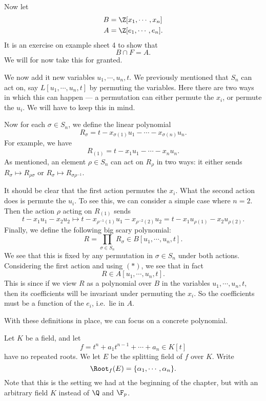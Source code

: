 \documentclass[a4paper]{article}
\begin{document}
Now let
\begin{align*}
  B &= \Z[x_1, \cdots, x_n]\\
  A &= \Z[e_1, \cdots, e_n].
\end{align*}
It is an exercise on example sheet 4 to show that
\[
  B\cap F = A.\tag{$*$}
\]
We will for now take this for granted.

We now add it new variables $u_1, \cdots, u_n, t$. We previously mentioned that $S_n$ can act on, say $L[u_1, \cdots, u_n, t]$ by permuting the variables. Here there are two ways in which this can happen --- a permutation can either permute the $x_i$, or permute the $u_i$. We will have to keep this in mind.

Now for each $\sigma \in S_n$, we define the linear polynomial
\[
  R_\sigma = t - x_{\sigma(1)} u_1 - \cdots - x_{\sigma(n)} u_n.
\]
For example, we have
\[
  R_{(1)} = t - x_1 u_1 - \cdots - x_n u_n.
\]
As mentioned, an element $\rho \in S_n$ can act on $R_\rho$ in two ways: it either sends $R_\sigma \mapsto R_{\rho \sigma}$ or $R_\sigma \mapsto R_{\sigma\rho^{-1}}$.

It should be clear that the first action permutes the $x_i$. What the second action does is permute the $u_i$. To see this, we can consider a simple case where $n = 2$. Then the action $\rho$ acting on $R_{(1)}$ sends
\[
  t - x_1 u_1 - x_2 u_2 \mapsto t - x_{\rho^{-1}(1)} u_1 - x_{\rho^{-2}(2)} u_2 = t - x_1 u_{\rho(1)} - x_2 u_{\rho(2)}.
\]
Finally, we define the following big scary polynomial:
\[
  R = \prod_{\sigma \in S_n} R_\sigma \in B[u_1, \cdots, u_n, t].
\]
We see that this is fixed by any permutation in $\sigma \in S_n$ under both actions. Considering the first action and using $(*)$, we see that in fact
\[
  R \in A[u_1, \cdots, u_n, t].
\]
This is since if we view $R$ as a polynomial over $B$ in the variables $u_1, \cdots, u_n, t$, then its coefficients will be invariant under permuting the $x_i$. So the coefficients must be a function of the $e_i$, i.e.\ lie in $A$.

With these definitions in place, we can focus on a concrete polynomial.

Let $K$ be a field, and let
\[
  f = t^n + a_1 t^{n - 1} + \cdots + a_n \in K[t]
\]
have no repeated roots. We let $E$ be the splitting field of $f$ over $K$. Write
\[
  \Root_f(E) = \{\alpha_1, \cdots, \alpha_n\}.
\]
Note that this is the setting we had at the beginning of the chapter, but with an arbitrary field $K$ instead of $\Q$ and $\F_p$.
\end{document}
